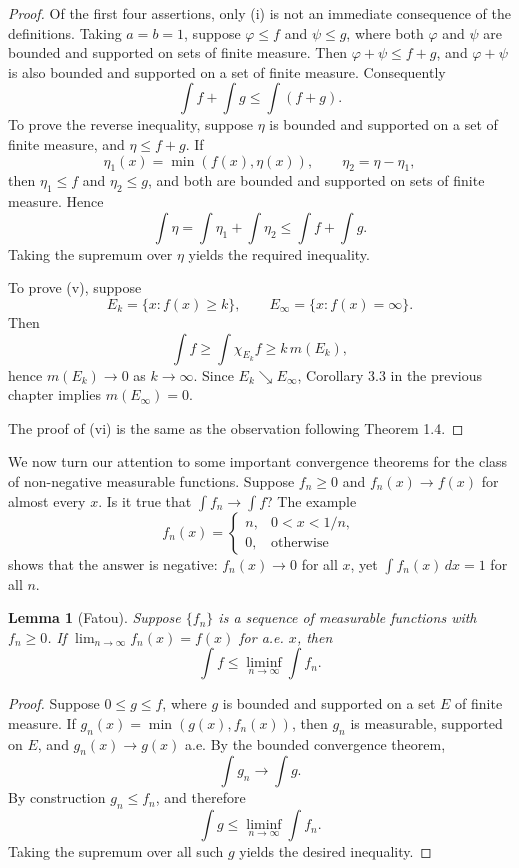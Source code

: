 \documentclass[11pt,openany]{book}
\newtheorem{lemma}[theorem]{Lemma}
\begin{document}
\begin{proof}
Of the first four assertions, only (i) is not an immediate consequence of the definitions. Taking $a=b=1$, suppose $\varphi\leq f$ and $\psi\leq g$, where both $\varphi$ and $\psi$ are bounded and supported on sets of finite measure. Then $\varphi+\psi\leq f+g$, and $\varphi+\psi$ is also bounded and supported on a set of finite measure. Consequently
\[
\int f+\int g\leq\int(f+g).
\]
To prove the reverse inequality, suppose $\eta$ is bounded and supported on a set of finite measure, and $\eta\leq f+g$. If
\[
\eta_1(x)=\min(f(x),\eta(x)),\qquad \eta_2=\eta-\eta_1,
\]
then $\eta_1\leq f$ and $\eta_2\leq g$, and both are bounded and supported on sets of finite measure. Hence
\[
\int\eta=\int\eta_1+\int\eta_2\leq\int f+\int g.
\]
Taking the supremum over $\eta$ yields the required inequality.

To prove (v), suppose
\[
E_k=\{x:f(x)\geq k\},\qquad E_\infty=\{x:f(x)=\infty\}.
\]
Then
\[
\int f\geq\int\chi_{E_k}f\geq k\,m(E_k),
\]
hence $m(E_k)\to0$ as $k\to\infty$. Since $E_k\searrow E_\infty$, Corollary 3.3 in the previous chapter implies $m(E_\infty)=0$.

The proof of (vi) is the same as the observation following Theorem 1.4.
\end{proof}

We now turn our attention to some important convergence theorems for the class of non-negative measurable functions. Suppose $f_n\geq0$ and $f_n(x)\to f(x)$ for almost every $x$. Is it true that $\int f_n\to\int f$? The example
\[
f_n(x)=
\begin{cases}
n,&0<x<1/n,\\
0,&\text{otherwise}
\end{cases}
\]
shows that the answer is negative: $f_n(x)\to0$ for all $x$, yet $\int f_n(x)\,dx=1$ for all $n$.

\begin{lemma}[Fatou]
Suppose $\{f_n\}$ is a sequence of measurable functions with $f_n\geq0$. If $\lim_{n\to\infty}f_n(x)=f(x)$ for a.e. $x$, then
\[
\int f\leq\liminf_{n\to\infty}\int f_n.
\]
\end{lemma}

\begin{proof}
Suppose $0\leq g\leq f$, where $g$ is bounded and supported on a set $E$ of finite measure. If $g_n(x)=\min(g(x),f_n(x))$, then $g_n$ is measurable, supported on $E$, and $g_n(x)\to g(x)$ a.e. By the bounded convergence theorem,
\[
\int g_n\to\int g.
\]
By construction $g_n\leq f_n$, and therefore
\[
\int g\leq\liminf_{n\to\infty}\int f_n.
\]
Taking the supremum over all such $g$ yields the desired inequality.
\end{proof}
\end{document}
